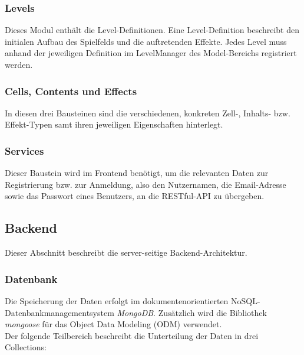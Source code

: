 \documentclass[letterpaper, 10 pt, conference]{ieeeconf}
\begin{document}
\subsubsection{Levels}

Dieses Modul enthält die Level-Definitionen.
Eine Level-Definition beschreibt den initialen Aufbau des Spielfelds und die auftretenden Effekte.
Jedes Level muss anhand der jeweiligen Definition im LevelManager des Model-Bereichs registriert werden.

\subsubsection{Cells, Contents und Effects}

In diesen drei Bausteinen sind die verschiedenen, konkreten Zell-, Inhalts- bzw. Effekt-Typen samt ihren jeweiligen Eigenschaften hinterlegt.

\subsubsection{Services}

Dieser Baustein wird im Frontend benötigt, um die relevanten Daten zur Registrierung bzw. zur Anmeldung, also den Nutzernamen, die Email-Adresse
sowie das Passwort eines Benutzers, an die RESTful-API zu übergeben.

\subsection{Backend}
Dieser Abschnitt beschreibt die server-seitige Backend-Architektur.

\subsubsection{Datenbank} \label{datenbank}

Die Speicherung der Daten erfolgt im dokumentenorientierten NoSQL-Datenbankmanagementsystem \textit{MongoDB}.
Zusätzlich wird die Bibliothek  \textit{mongoose} für das Object Data Modeling (ODM) verwendet. \\
Der folgende Teilbereich beschreibt die Unterteilung der Daten in drei Collections:
\end{document}
